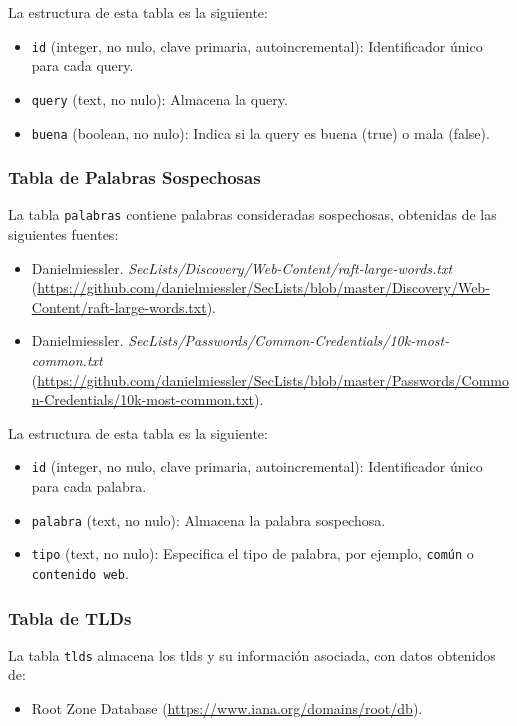 La estructura de esta tabla es la siguiente:
\begin{itemize}
    \item \texttt{id} (integer, no nulo, clave primaria, autoincremental): Identificador único para cada \gls{query}.
    \item \texttt{query} (text, no nulo): Almacena la \gls{query}.
    \item \texttt{buena} (boolean, no nulo): Indica si la \gls{query} es buena (true) o mala (false).
\end{itemize}

\subsubsection*{Tabla de Palabras Sospechosas}
La tabla \texttt{palabras} contiene palabras consideradas sospechosas, obtenidas de las siguientes fuentes:
\begin{itemize}
    \item Danielmiessler. \textit{SecLists/Discovery/Web-Content/raft-large-words.txt} (\url{https://github.com/danielmiessler/SecLists/blob/master/Discovery/Web-Content/raft-large-words.txt}).
    \item Danielmiessler. \textit{SecLists/Passwords/Common-Credentials/10k-most-common.txt} (\url{https://github.com/danielmiessler/SecLists/blob/master/Passwords/Common-Credentials/10k-most-common.txt}).
\end{itemize}

La estructura de esta tabla es la siguiente:
\begin{itemize}
    \item \texttt{id} (integer, no nulo, clave primaria, autoincremental): Identificador único para cada palabra.
    \item \texttt{palabra} (text, no nulo): Almacena la palabra sospechosa.
    \item \texttt{tipo} (text, no nulo): Especifica el tipo de palabra, por ejemplo, \texttt{común} o \texttt{contenido web}.
\end{itemize}

\subsubsection*{Tabla de TLDs}
La tabla \texttt{tlds} almacena los \glspl{tld} y su información asociada, con datos obtenidos de:
\begin{itemize}
    \item Root Zone Database (\url{https://www.iana.org/domains/root/db}).
\end{itemize}

